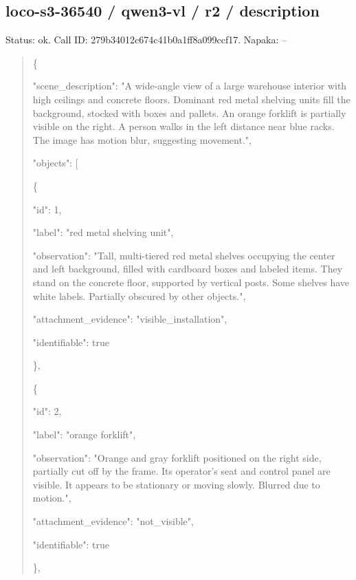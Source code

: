 \documentclass[10pt,a4paper]{article}
\begin{document}
\subsection*{loco-s3-36540 / qwen3-vl / r2 / description}
Status: ok. Call ID: 279b34012c674c41b0a1ff8a099ccf17. Napaka: --
\begin{quote}\footnotesize
\{\par
  "scene\_description":\allowbreak{} "A wide-angle view of a large warehouse interior with high ceilings and concrete floors. Dominant red metal shelving units fill the background,\allowbreak{} stocked with boxes and pallets. An orange forklift is partially visible on the right. A person walks in the left distance near blue racks. The image has motion blur,\allowbreak{} suggesting movement.",\allowbreak{}\par
  "objects":\allowbreak{} [\par
    \{\par
      "id":\allowbreak{} 1,\allowbreak{}\par
      "label":\allowbreak{} "red metal shelving unit",\allowbreak{}\par
      "observation":\allowbreak{} "Tall,\allowbreak{} multi-tiered red metal shelves occupying the center and left background,\allowbreak{} filled with cardboard boxes and labeled items. They stand on the concrete floor,\allowbreak{} supported by vertical posts. Some shelves have white labels. Partially obscured by other objects.",\allowbreak{}\par
      "attachment\_evidence":\allowbreak{} "visible\_installation",\allowbreak{}\par
      "identifiable":\allowbreak{} true\par
    \},\allowbreak{}\par
    \{\par
      "id":\allowbreak{} 2,\allowbreak{}\par
      "label":\allowbreak{} "orange forklift",\allowbreak{}\par
      "observation":\allowbreak{} "Orange and gray forklift positioned on the right side,\allowbreak{} partially cut off by the frame. Its operator's seat and control panel are visible. It appears to be stationary or moving slowly. Blurred due to motion.",\allowbreak{}\par
      "attachment\_evidence":\allowbreak{} "not\_visible",\allowbreak{}\par
      "identifiable":\allowbreak{} true\par
    \},\allowbreak{}\par

\end{quote}
\end{document}
